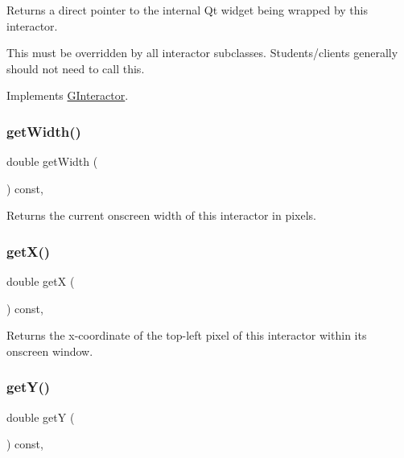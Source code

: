 Returns a direct pointer to the internal Qt widget being wrapped by this interactor. 

This must be overridden by all interactor subclasses. Students/clients generally should not need to call this. 

Implements \mbox{\hyperlink{classGInteractor}{G\+Interactor}}.

\mbox{\label{classGInteractor_a0ed2965abd4f5701d2cadf71239faf19}} 
\subsubsection{\texorpdfstring{get\+Width()}{getWidth()}}
{\footnotesize\ttfamily double get\+Width (\begin{DoxyParamCaption}{ }\end{DoxyParamCaption}) const\hspace{0.3cm}{\ttfamily [virtual]}, {\ttfamily [inherited]}}



Returns the current onscreen width of this interactor in pixels. 

\mbox{\label{classGInteractor_a344385751bee0720059403940d57a13e}} 
\subsubsection{\texorpdfstring{get\+X()}{getX()}}
{\footnotesize\ttfamily double getX (\begin{DoxyParamCaption}{ }\end{DoxyParamCaption}) const\hspace{0.3cm}{\ttfamily [virtual]}, {\ttfamily [inherited]}}



Returns the x-\/coordinate of the top-\/left pixel of this interactor within its onscreen window. 

\mbox{\label{classGInteractor_aafa51c7f8f38a09febbb9ce7853f77b4}} 
\subsubsection{\texorpdfstring{get\+Y()}{getY()}}
{\footnotesize\ttfamily double getY (\begin{DoxyParamCaption}{ }\end{DoxyParamCaption}) const\hspace{0.3cm}{\ttfamily [virtual]}, {\ttfamily [inherited]}}



